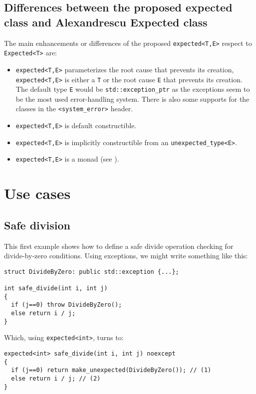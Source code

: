 \documentclass[a4paper,10pt]{article}
\newcommand{\cpp}[1]{\lstinline{#1}}
\begin{document}
\subsection{Differences between the proposed expected class and Alexandrescu Expected class}

The main enhancements or differences of the proposed \cpp{expected<T,E>} respect to \cpp{Expected<T>} are:
\begin{itemize}
 \item \cpp{expected<T,E>} parameterizes the root cause that prevents its creation, \cpp{expected<T,E>} is either a \cpp{T} or the root cause \cpp{E} that prevents its creation. The default type \cpp{E} would be \cpp{std::exception_ptr} as the exceptions seem to be the most used error-handling system. There is also some supports for the classes in the \cpp{<system_error>} header.
 \item \cpp{expected<T,E>} is default constructible.
 \item \cpp{expected<T,E>} is implicitly constructible from an \cpp{unexpected_type<E>}.
 \item \cpp{expected<T,E>} is a monad (see \cite{MONAD}).
\end{itemize}

\section{Use cases}

\subsection{Safe division}
\label{divide-example}

This first example shows how to define a safe divide operation checking for divide-by-zero conditions. Using exceptions, we might write something like this:

\begin{lstlisting}
struct DivideByZero: public std::exception {...};

int safe_divide(int i, int j)
{
  if (j==0) throw DivideByZero();
  else return i / j;
}
\end{lstlisting}

\noindent
Which, using \cpp{expected<int>}, turns to:

\begin{lstlisting}
expected<int> safe_divide(int i, int j) noexcept
{
  if (j==0) return make_unexpected(DivideByZero()); // (1)
  else return i / j; // (2)
}
\end{lstlisting}
\end{document}
